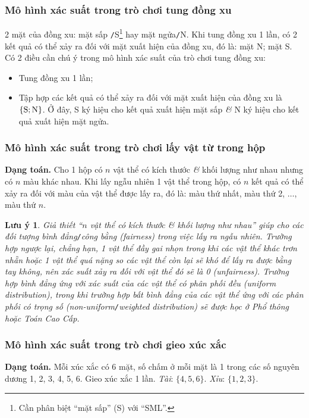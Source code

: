 \documentclass{article}
\numberwithin{equation}{section}
\newtheorem{luuy}{Lưu ý}[section]
\begin{document}
\subsubsection{Mô hình xác suất trong trò chơi tung đồng xu}
2 mặt của đồng xu: mặt sấp \texttt{/}S\footnote{Cần phân biệt ``mặt sấp'' (S) với ``SML''.} hay mặt ngửa\texttt{/}N. Khi tung đồng xu 1 lần, có 2 kết quả có thể xảy ra đối với mặt xuất hiện của đồng xu, đó là: mặt N; mặt S. Có 2 điều cần chú ý trong mô hình xác suất của trò chơi tung đồng xu:
\begin{itemize}
	\item Tung đồng xu 1 lần;
	\item Tập hợp các kết quả có thể xảy ra đối với mặt xuất hiện của đồng xu là $\{\rm S;N\}$. Ở đây, S ký hiệu cho kết quả xuất hiện mặt sấp \textit{\&} N ký hiệu cho kết quả xuất hiện mặt ngửa.
\end{itemize}

\subsubsection{Mô hình xác suất trong trò chơi lấy vật từ trong hộp}
\textbf{Dạng toán.} Cho 1 hộp có $n$ vật thể có kích thước \textit{\&} khối lượng như nhau nhưng có $n$ màu khác nhau. Khi lấy ngẫu nhiên 1 vật thể trong hộp, có $n$ kết quả có thể xảy ra đối với màu của vật thể được lấy ra, đó là: màu thứ nhất, màu thứ 2, $\ldots$, màu thứ $n$.

\begin{luuy}
	Giả thiết ``$n$ vật thể có kích thước \textit{\&} khối lượng như nhau'' giúp cho các đối tượng bình đẳng\emph{\texttt{/}}công bằng (fairness) trong việc lấy ra ngẫu nhiên. Trường hợp ngược lại, chẳng hạn, 1 vật thể đầy gai nhọn trong khi các vật thể khác trơn nhẵn hoặc 1 vật thể quá nặng so các vật thể còn lại sẽ khó để lấy ra được bằng tay không, nên xác suất xảy ra đối với vật thể đó sẽ là 0 (unfairness). Trường hợp bình đẳng ứng với xác suất của các vật thể có phân phối đều (uniform distribution), trong khi trường hợp bất bình đẳng của các vật thể ứng với các phân phối có trọng số (non-uniform\emph{\texttt{/}}weighted distribution) sẽ được học ở Phổ thông hoặc Toán Cao Cấp.
\end{luuy}

\subsubsection{Mô hình xác suất trong trò chơi gieo xúc xắc}
\textbf{Dạng toán.} Mỗi xúc xắc có 6 mặt, số chấm ở mỗi mặt là 1 trong các số nguyên dương 1, 2, 3, 4, 5, 6. Gieo xúc xắc 1 lần. \textit{Tài}: $\{4,5,6\}$. \textit{Xỉu}: $\{1,2,3\}$.
\end{document}
